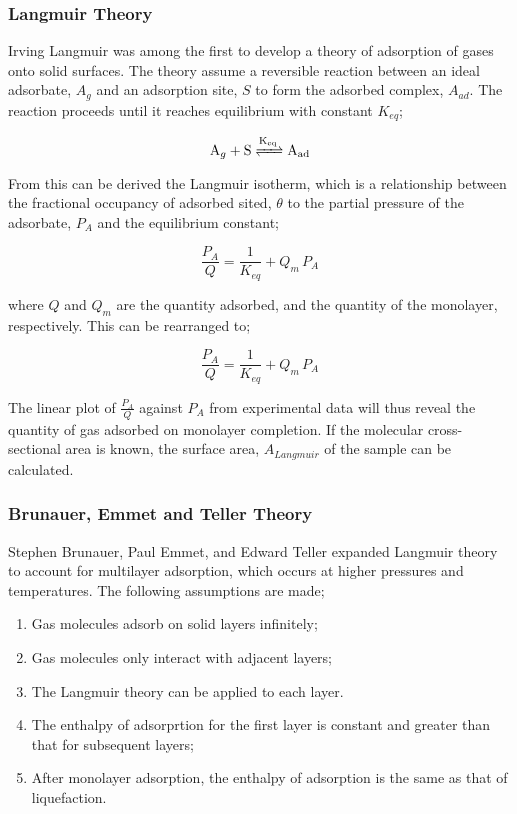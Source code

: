 \subsubsection{Langmuir Theory}

Irving Langmuir was among the first to develop a theory of adsorption of gases onto solid surfaces. The theory assume a reversible reaction between an ideal adsorbate, $A_g$ and an adsorption site, $S$ to form the adsorbed complex, $A_{ad}$. The reaction proceeds until it reaches equilibrium with constant $K_{eq}$;

\begin{equation}
    \ce{A_g + S <=>[K_{eq}] A_{ad}}
\end{equation}

From this can be derived the Langmuir isotherm, which is a relationship between the fractional occupancy of adsorbed sited, $\theta$ to the partial pressure of the adsorbate, $P_A$ and the equilibrium constant; 

\begin{equation}
    \frac{P_A}{Q} = \frac{1}{K_{eq}} + Q_m \, P_A
\end{equation}

where $Q$ and $Q_m$ are the quantity adsorbed, and the quantity of the monolayer, respectively.\citep{Langmuir1916constitution, Langmuir1918adsorption} This can be rearranged to;

\begin{equation}
    \frac{P_A}{Q} = \frac{1}{K_{eq}} + Q_m \, P_A
\end{equation}

The linear plot of $\frac{P_A}{Q}$ against $P_A $ from experimental data will thus reveal the quantity of gas adsorbed on monolayer completion. If the molecular cross-sectional area is known, the surface area, $A_{Langmuir}$ of the sample can be calculated.

\subsubsection{Brunauer, Emmet and Teller Theory}

Stephen Brunauer, Paul Emmet, and Edward Teller expanded Langmuir theory to account for multilayer adsorption, which occurs at higher pressures and temperatures. The following assumptions are made;

	\begin{enumerate}
		\item Gas molecules adsorb on solid layers infinitely;
		\item Gas molecules only interact with adjacent layers;
		\item The Langmuir theory can be applied to each layer.
		\item The enthalpy of adsorprtion for the first layer is constant and greater than that for subsequent layers;
		\item After monolayer adsorption, the enthalpy of adsorption is the same as that of liquefaction.
	\end{enumerate}

